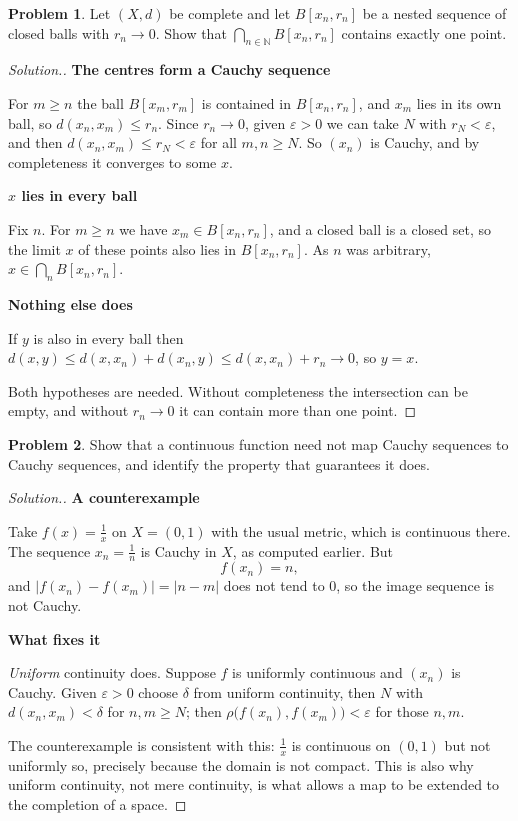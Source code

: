 \documentclass[11pt,a4paper]{article}
\theoremstyle{definition}
\newtheorem{problemx}{Problem}[section]
\newenvironment{problem}{\begin{problemx}}{\end{problemx}}
\newenvironment{solution}
  {\renewcommand{\qedsymbol}{}\begin{proof}[\textit{Solution}.]}
  {\end{proof}}
\newcommand{\subhead}[1]{%
  \par\medskip\noindent\textbf{#1}\par\nobreak\smallskip}
\begin{document}
\begin{problem}
Let $(X,d)$ be complete and let $B[x_n,r_n]$ be a nested sequence of closed
balls with $r_n\rightarrow 0$. Show that $\bigcap_{n\in\mathbb{N}}B[x_n,r_n]$
contains exactly one point.
\end{problem}
\begin{solution}
\subhead{The centres form a Cauchy sequence}
For $m\geq n$ the ball $B[x_m,r_m]$ is contained in $B[x_n,r_n]$, and
$x_m$ lies in its own ball, so $d(x_n,x_m)\leq r_n$. Since $r_n\rightarrow 0$,
given $\varepsilon>0$ we can take $N$ with $r_N<\varepsilon$, and then
$d(x_n,x_m)\leq r_N<\varepsilon$ for all $m,n\geq N$. So $(x_n)$ is Cauchy, and
by completeness it converges to some $x$.

\subhead{$x$ lies in every ball}
Fix $n$. For $m\geq n$ we have $x_m\in B[x_n,r_n]$, and a closed ball is a
closed set, so the limit $x$ of these points also lies in $B[x_n,r_n]$. As $n$
was arbitrary, $x\in\bigcap_n B[x_n,r_n]$.

\subhead{Nothing else does}
If $y$ is also in every ball then $d(x,y)\leq d(x,x_n)+d(x_n,y)\leq
d(x,x_n)+r_n\rightarrow 0$, so $y=x$.

Both hypotheses are needed. Without completeness the intersection can be empty,
and without $r_n\rightarrow 0$ it can contain more than one point.
\end{solution}

\begin{problem}
Show that a continuous function need not map Cauchy sequences to Cauchy
sequences, and identify the property that guarantees it does.
\end{problem}
\begin{solution}
\subhead{A counterexample}
Take $f(x)=\frac1x$ on $X=(0,1)$ with the usual metric, which is continuous
there. The sequence $x_n=\frac1n$ is Cauchy in $X$, as computed earlier. But
$$f(x_n)=n ,$$
and $|f(x_n)-f(x_m)|=|n-m|$ does not tend to $0$, so the image sequence is not
Cauchy.

\subhead{What fixes it}
\emph{Uniform} continuity does. Suppose $f$ is uniformly continuous and
$(x_n)$ is Cauchy. Given $\varepsilon>0$ choose $\delta$ from uniform
continuity, then $N$ with $d(x_n,x_m)<\delta$ for $n,m\geq N$; then
$\rho\big(f(x_n),f(x_m)\big)<\varepsilon$ for those $n,m$.

The counterexample is consistent with this: $\frac1x$ is continuous on $(0,1)$
but not uniformly so, precisely because the domain is not compact. This is also
why uniform continuity, not mere continuity, is what allows a map to be
extended to the completion of a space.
\end{solution}
\end{document}
